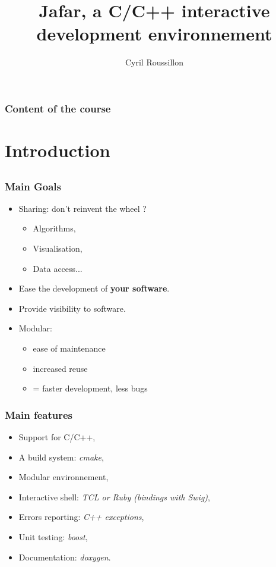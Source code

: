 \documentclass[compress]{beamer}
\title{Jafar, a C/C++ interactive development environnement}
\author{Cyril Roussillon}
\begin{document}
\begin{frame}
  \titlepage
\end{frame}

\begin{frame}
  \frametitle{Content of the course}
  \tableofcontents
\end{frame}


\section{Introduction}
\subsection*{}


\begin{frame}
  \frametitle{Main Goals}
  \begin{itemize}
   \item<1-> Sharing: don't reinvent the wheel ?
    \begin{itemize}
     \item<2-> Algorithms,
     \item<3-> Visualisation,
     \item<4-> Data access...
    \end{itemize}
   \item<5-> Ease the development of \textbf{your software}.
   \item<6-> Provide visibility to software.
   \item<7-> Modular:
    \begin{itemize}
      \item<8-> ease of maintenance
      \item<9-> increased reuse
      \item<10-> = faster development, less bugs
		\end{itemize}
  \end{itemize}
\end{frame}

\begin{frame}
 \frametitle{Main features}
 \begin{itemize}
  \item<1-> Support for C/C++,
  \item<2-> A build system: \textit{cmake},
  \item<3-> Modular environnement,
  \item<4-> Interactive shell: \textit{TCL or Ruby (bindings with Swig)},
  \item<6-> Errors reporting: \textit{C++ exceptions},
  \item<7-> Unit testing: \textit{boost},
  \item<8-> Documentation: \textit{doxygen}.
 \end{itemize}
\end{frame}
\end{document}
